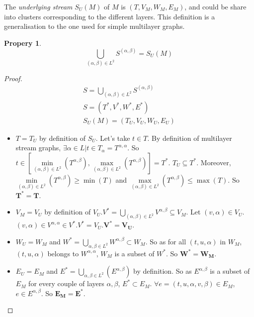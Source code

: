 \documentclass[dvipsnames,a4paper,11pt]{article}
\newtheorem{prop}{Propery}
\theoremstyle{definition}
\theoremstyle{remark}
\theoremstyle{remark}
\begin{document}
    The {\em underlying stream } $S_U(M)$ of $M$ is $(T,V_M,W_M,E_M)$, and could be share into clusters corresponding to the different layers. This definition is a generalisation to the one used for simple multilayer graphs.

	\begin{prop}
		\[
			\bigcup_{(\alpha,\beta) \in L^2} S^{(\alpha,\beta)} = S_U(M)
		\]
	\end{prop}
	\begin{proof}
		\begin{align*}
			S=\bigcup_{(\alpha,\beta) \in L^2} S^{(\alpha,\beta)}\\
			S=(T^{*},V^{*},W^{*},E^{*})\\
			S_U(M) = (T_U,V_U,W_U,E_U)			
		\end{align*}		 
	
	
	\begin{itemize}
		\item $T=T_U$ by definition of $S_U$. Let's take $t\in T$. By definition of multilayer stream graphs, $\exists \alpha \in L | t\in T_{\alpha}=T^{\alpha,\alpha}$. So $t \in [\underset{(\alpha,\beta) \in L^2}{\min}(T^{\alpha,\beta}),\underset{(\alpha,\beta) \in L^2}{\max}(T^{\alpha,\beta})]=T^{*}$. $T_U \subseteq T^{*}$. 
	Moreover, $\underset{(\alpha,\beta) \in L^2}{\min}(T^{\alpha,\beta}) \geq \min(T)$ 
	and $\underset{(\alpha,\beta) \in L^2}{\max}(T^{\alpha,\beta}) \leq \max(T)$. 
	So $\mathbf{T^{*} = T}$.
		\item  $V_M = V_U$ by definition of $V_U$.$V^{*}=\bigcup_{(\alpha,\beta) \in L^2} V^{\alpha,\beta} \subseteq V_M$.
	Let $(v,\alpha) \in V_U$. $(v,\alpha) \in V^{\alpha,\alpha} \in V^{*}$.$V^{*}=V_U$.$\mathbf{V^{*}=V_U}$.
		\item $W_U=W_M$ and $W^{*}=\bigcup_{\alpha,\beta \in L^2} W^{\alpha,\beta} \subset W_M$. So as for all $ (t,u,\alpha)$ in $W_M$, $(t,u,\alpha)$ belongs to $W^{\alpha,\alpha}$, $W_M$ is a subset of $W^{*}$. So $\mathbf{W^{*}=W_M}$.
		\item $E_U=E_M$ and $E^{*}=\bigcup_{\alpha,\beta \in L^2}(E^{\alpha,\beta})$ by definition. So as $E^{\alpha,\beta}$ is a subset of $E_M$ for every couple of layers $\alpha,\beta$, $E^{*} \subset E_M$. 
		$\forall e =(t,u,\alpha,v,\beta) \in E_M$, $e \in E^{\alpha,\beta}$. So $\mathbf{E_M=E^{*}}$.
	\end{itemize}		
	\end{proof}



   

	
\end{document}
